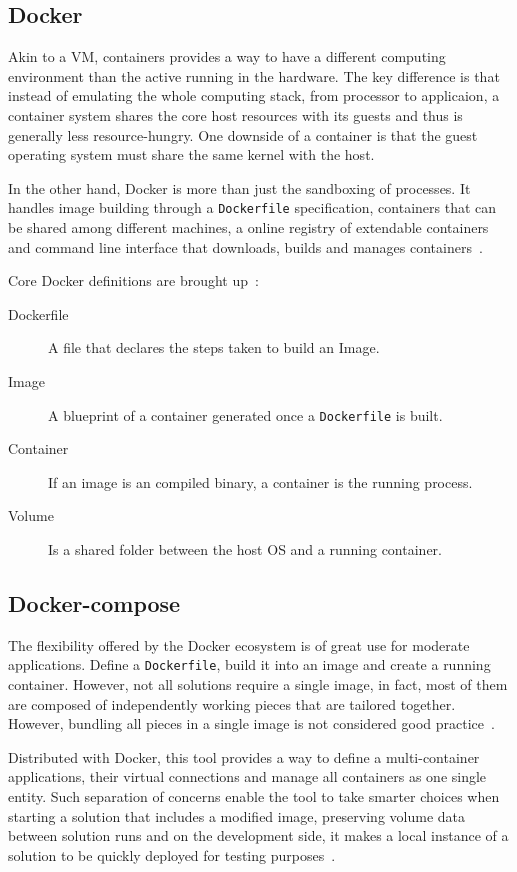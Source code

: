 \subsection{Docker}
Akin to a \gls{VM}, containers provides a way to have a different computing environment than the active running in the hardware. The key difference is that instead of emulating the whole computing stack, from processor to applicaion, a container system shares the core host resources with its guests and thus is generally less resource-hungry. One downside of a container is that the guest operating system must share the same kernel with the host.

In the other hand, Docker is more than just the sandboxing of processes. It handles image building through a \texttt{Dockerfile} specification, containers that can be shared among different machines, a online registry of extendable containers and command line interface that downloads, builds and manages containers~\cite{dockerfag}.

Core Docker definitions are brought up~\cite{dockeroverview}:

\begin{description}
\item[Dockerfile] A file that declares the steps taken to build an Image.
\item[Image] A blueprint of a container generated once a \texttt{Dockerfile} is built.
\item[Container] If an image is an compiled binary, a container is the running process. 
\item[Volume] Is a shared folder between the host \gls{OS} and a running container.
\end{description}

\subsection{Docker-compose}
The flexibility offered by the Docker ecosystem is of great use for moderate applications. Define a \texttt{Dockerfile}, build it into an image and create a running container. However, not all solutions require a single image, in fact, most of them are composed of independently working pieces that are tailored together. However, bundling all pieces in a single image is not considered good practice~\cite{dockerfag}.

Distributed with Docker, this tool provides a way to define a multi-container applications, their virtual connections and manage all containers as one single entity. Such separation of concerns enable the tool to take smarter choices when starting a solution that includes a modified image, preserving volume data between solution runs and on the development side, it makes a local instance of a solution to be quickly deployed for testing purposes~\cite{compose}. 

